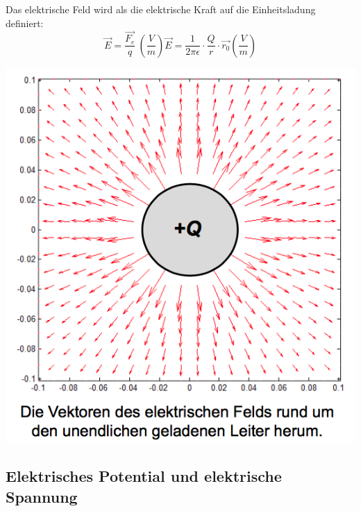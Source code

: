 \begin{minipage}{0.5 \linewidth}
Das elektrische Feld wird als die elektrische Kraft auf die Einheitsladung definiert:
\begin{equation}
\vec{E} = \frac{\vec{F_{e}}}{q} \ (\frac{V}{m})
\vec{E} = \frac{1}{2 \pi \epsilon} \cdot \frac{Q}{r} \cdot \vec{r_{0}}(\frac{V}{m})
\end{equation}
\end{minipage}
\begin{minipage}{0.4 \linewidth}
\includegraphics[width = \linewidth]{./Pics/VL1/elFeld}
\end{minipage}

\subsection{Elektrisches Potential und elektrische Spannung}


